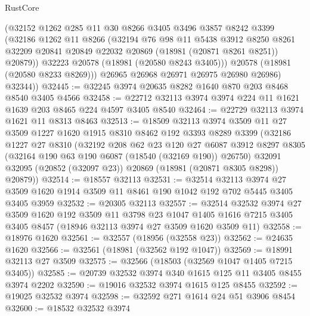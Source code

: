 \begin{lexlean}{RustCore}
\begin{coremodule}
            (@32152
              @1262
              @285
              @11
              @30
              @8266
              @3405
              @3496
              @3857
              @8242
              @3399
              (@32186
                @1262
                @11
                @8266
                (@32194
                  @76
                  @98
                  @11
                  @5438
                  @3912
                  @8250
                  @8261
                  @32209
                  @20841
                  @20849
                  @22032
                  @20869
                  (@18981 (@20871 @8261 @8251))
                  @20879))
              @32223
              @20578
              (@18981 (@20580 @8243 @3405)))
            @20578
            (@18981 (@20580 @8233 @8269)))
          @26965
          @26968
          @26971
          @26975
          @26980
          @26986)
        @32344))
@32445 := @32245 @3974 @20635 @8282 @1640 @870 @203 @8468 @8540 @3405 @4566
@32458 := @22712 @32113 @3974 @3974 @224 @11 @1621 @1639 @203 @8465 @224 @4597 @3405 @8540
@32464 := @22729 @32113 @3974 @1621 @11 @8313 @8463
@32513 := @18509
    @32113
    @3974
    @3509
    @11
    @27
    @3509
    @1227
    @1620
    @1915
    @8310
    @8462
    @192
    @3393
    @8289
    @3399
    (@32186
      @1227
      @27
      @8310
      (@32192
        @208
        @62
        @23
        @120
        @27
        @6087
        @3912
        @8297
        @8305
        (@32164 @190 @63 @190 @6087 (@18540 (@32169 @190)) @26750)
        @32091
        @32095
        (@20852 (@32097 @23))
        @20869
        (@18981 (@20871 @8305 @8298))
        @20879))
@32514 := @18557 @32113
@32531 := @32514
    @32113
    @3974
    @27
    @3509
    @1620
    @1914
    @3509
    @11
    @8461
    @190
    @1042
    @192
    @702
    @5445
    @3405
    @3405
    @3959
@32532 := @20305 @32113
@32557 := @32514
    @32532
    @3974
    @27
    @3509
    @1620
    @192
    @3509
    @11
    @3798
    @23
    @1047
    @1405
    @1616
    @7215
    @3405
    @3405
    @8457
    (@18946 @32113 @3974 @27 @3509 @1620 @3509 @11)
@32558 := @18976 @1620
@32561 := @32557 (@18956 (@32558 @23))
@32562 := @24635 @1620
@32566 := @32561 (@18981 (@32562 @192 @1047))
@32569 := @18991 @32113 @27 @3509
@32575 := @32566 (@18503 (@32569 @1047 @1405 @7215 @3405))
@32585 := @20739 @32532 @3974 @340 @1615 @125 @11 @3405 @8455 @3974 @2202
@32590 := @19016 @32532 @3974 @1615 @125 @8455
@32592 := @19025 @32532 @3974
@32598 := @32592 @271 @1614 @24 @51 @3906 @8454
@32600 := @18532 @32532 @3974

\end{coremodule}
\end{lexlean}
